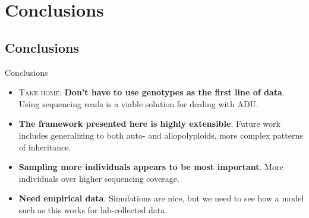 \documentclass[presentation,serif]{beamer}
\begin{document}
\section{Conclusions}

\subsection*{Conclusions}

\begin{frame}[t]{Conclusions}
	\fontsize{10pt}{10}\selectfont
	\begin{itemize}
		\item \textsc{Take home}: \textbf{Don't have to use genotypes as the first line of data}. Using sequencing reads is a viable solution for dealing with ADU.
		\vspace{0.2in}

		\item \textbf{The framework presented here is highly extensible}. Future work includes generalizing to both auto- and allopolyploids, more complex patterns of inheritance.
		\vspace{0.2in}

		\item \textbf{Sampling more individuals appears to be most important}. More individuals over higher sequencing coverage.
		\vspace{0.2in}

		\item \textbf{Need empirical data}. Simulations are nice, but we need to see how a model such as this works for lab-collected data.

	\end{itemize}

\end{frame}

\section*{}
\end{document}
